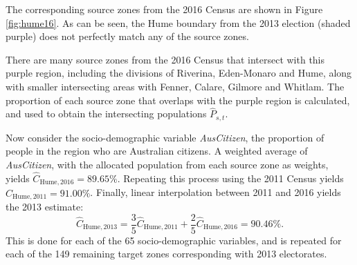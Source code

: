 \documentclass[11pt,a4paper,]{article}
\let\origtable\table
\let\endorigtable\endtable
\renewenvironment{table}[1][2] {
    \expandafter\origtable\expandafter[htbp]
} {
    \endorigtable
}
\begin{document}
The corresponding source zones from the 2016 Census are shown in Figure
\ref{fig:hume16}. As can be seen, the Hume boundary from the 2013
election (shaded purple) does not perfectly match any of the source
zones.

There are many source zones from the 2016 Census that intersect with
this purple region, including the divisions of Riverina, Eden-Monaro and
Hume, along with smaller intersecting areas with Fenner, Calare, Gilmore
and Whitlam. The proportion of each source zone that overlaps with the
purple region is calculated, and used to obtain the intersecting
populations \(\hat{P}_{s,t}\).

\begin{table}[t]

\caption{\label{tab:hume1}Population from each intersecting Census source zone (2016) that is allocated to the target zone (purple region - Hume electoral boundary in 2013), and the corresponding proportion of Australian citizens in each of these source zones.}
\centering
{}
\end{table}

Now consider the socio-demographic variable \emph{AusCitizen}, the
proportion of people in the region who are Australian citizens. A
weighted average of \emph{AusCitizen}, with the allocated population
from each source zone as weights, yields
\(\hat{C}_{\text{Hume},2016} = 89.65\%\). Repeating this process using
the 2011 Census yields \(\hat{C}_{\text{Hume},2011} = 91.00\%\).
Finally, linear interpolation between 2011 and 2016 yields the 2013
estimate: \[
  \hat{C}_{\text{Hume},2013}
    = \frac{3}{5} \hat{C}_{\text{Hume},2011} + \frac{2}{5} \hat{C}_{\text{Hume},2016}
    =  90.46\%.
\] This is done for each of the 65 socio-demographic variables, and is
repeated for each of the 149 remaining target zones corresponding with
2013 electorates.
\end{document}
